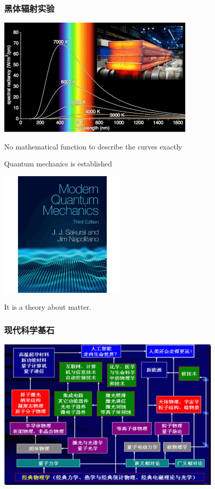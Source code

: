 \begin{frame}
    \frametitle{黑体辐射实验}
    \begin{center}
    \includegraphics[width=0.7\textwidth]{figs/2021-12-01-23-47-27.png}
    \end{center}
    No mathematical function to describe the curves exactly 
\end{frame}
\begin{frame}
    Quantum mechanics is established  
    \begin{center}
        \includegraphics[width=0.45\textwidth]{figs/mqm.jpg}
    \end{center}   
    It is a theory about matter.
\end{frame}

\begin{frame}
    \frametitle{现代科学基石}
    \begin{center}
        \includegraphics[width=0.8\textwidth]{figs/stone.png}
    \end{center}   
\end{frame}

